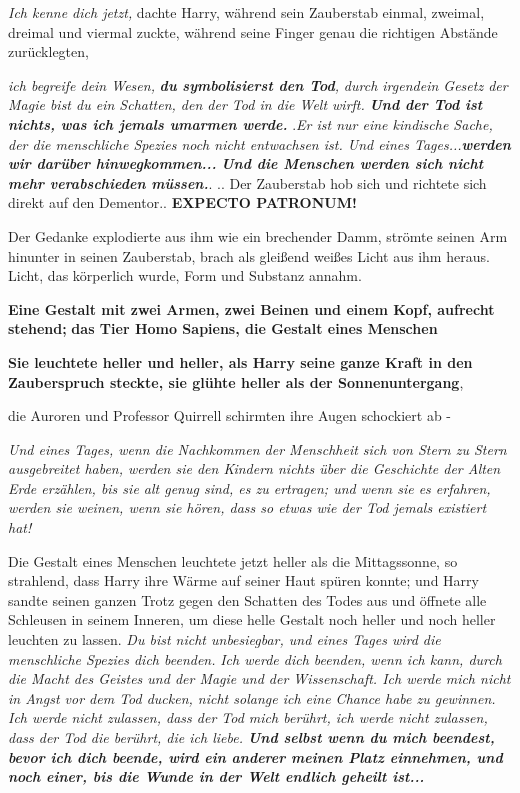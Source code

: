 \emph{Ich kenne dich jetzt,} dachte Harry, während sein Zauberstab einmal,
zweimal, dreimal und viermal zuckte, während seine Finger genau die richtigen
Abstände zurücklegten,

\emph{ich begreife dein Wesen,} \textbf{\emph{du symbolisierst den Tod}}\emph{,}
\emph{durch irgendein Gesetz der Magie bist du ein Schatten, den der Tod in die
Welt wirft.} \textbf{\emph{ Und der Tod ist nichts, was ich jemals umarmen
werde.} } \grqq{}.\emph{Er ist nur eine kindische Sache, der die menschliche
Spezies noch nicht entwachsen ist. Und eines Tages...}\textbf{\emph{werden wir
darüber hinwegkommen...} } \textbf{\emph{Und die Menschen werden sich nicht mehr
verabschieden müssen.}}\grqq{}. .. Der Zauberstab hob sich und richtete sich
direkt auf den Dementor.\grqq{}. \textbf{ \glqq{}EXPECTO PATRONUM!}\grqq{}

Der Gedanke explodierte aus ihm wie ein brechender Damm, strömte seinen Arm
hinunter in seinen Zauberstab, brach als gleißend weißes Licht aus ihm heraus.
Licht, das körperlich wurde, Form und Substanz annahm.


\textbf{Eine Gestalt mit zwei Armen, zwei Beinen und einem Kopf, aufrecht
stehend;} \textbf{das Tier Homo Sapiens, die Gestalt eines Menschen}

\textbf{Sie leuchtete heller und heller, als Harry seine ganze Kraft in den
Zauberspruch steckte, sie glühte heller als der Sonnenuntergang},

die Auroren und Professor Quirrell schirmten ihre Augen schockiert ab -

\emph{Und eines Tages, wenn die Nachkommen der Menschheit sich von Stern zu
Stern ausgebreitet haben, werden sie den Kindern nichts über die Geschichte der
Alten Erde erzählen, bis sie alt genug sind, es zu ertragen; und wenn sie es
erfahren, werden sie weinen, wenn sie hören, dass so etwas wie der Tod jemals
existiert hat!}

Die Gestalt eines Menschen leuchtete jetzt heller als die Mittagssonne, so
strahlend, dass Harry ihre Wärme auf seiner Haut spüren konnte; und Harry sandte
seinen ganzen Trotz gegen den Schatten des Todes aus und öffnete alle Schleusen
in seinem Inneren, um diese helle Gestalt noch heller und noch heller leuchten
zu lassen. \emph{ Du bist nicht unbesiegbar, und eines Tages wird die
menschliche Spezies dich beenden.} \emph{Ich werde dich beenden, wenn ich kann,
durch die Macht des Geistes und der Magie und der Wissenschaft. Ich werde mich
nicht in Angst vor dem Tod ducken, nicht solange ich eine Chance habe zu
gewinnen. Ich werde nicht zulassen, dass der Tod mich berührt, ich werde nicht
zulassen, dass der Tod die berührt, die ich liebe. \textbf{ Und selbst wenn du
mich beendest, bevor ich dich beende, wird ein anderer meinen Platz einnehmen,
und noch einer, bis die Wunde in der Welt endlich geheilt ist...} }

